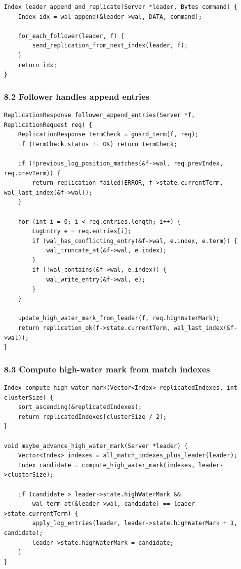 \documentclass[10pt,letterpaper]{article}
\begin{document}
\begin{verbatim}
Index leader_append_and_replicate(Server *leader, Bytes command) {
    Index idx = wal_append(&leader->wal, DATA, command);

    for_each_follower(leader, f) {
        send_replication_from_next_index(leader, f);
    }
    return idx;
}
\end{verbatim}

\subsubsection*{8.2 Follower handles append entries}

\begin{verbatim}
ReplicationResponse follower_append_entries(Server *f, ReplicationRequest req) {
    ReplicationResponse termCheck = guard_term(f, req);
    if (termCheck.status != OK) return termCheck;

    if (!previous_log_position_matches(&f->wal, req.prevIndex, req.prevTerm)) {
        return replication_failed(ERROR, f->state.currentTerm, wal_last_index(&f->wal));
    }

    for (int i = 0; i < req.entries.length; i++) {
        LogEntry e = req.entries[i];
        if (wal_has_conflicting_entry(&f->wal, e.index, e.term)) {
            wal_truncate_at(&f->wal, e.index);
        }
        if (!wal_contains(&f->wal, e.index)) {
            wal_write_entry(&f->wal, e);
        }
    }

    update_high_water_mark_from_leader(f, req.highWaterMark);
    return replication_ok(f->state.currentTerm, wal_last_index(&f->wal));
}
\end{verbatim}

\subsubsection*{8.3 Compute high-water mark from match indexes}

\begin{verbatim}
Index compute_high_water_mark(Vector<Index> replicatedIndexes, int clusterSize) {
    sort_ascending(&replicatedIndexes);
    return replicatedIndexes[clusterSize / 2];
}

void maybe_advance_high_water_mark(Server *leader) {
    Vector<Index> indexes = all_match_indexes_plus_leader(leader);
    Index candidate = compute_high_water_mark(indexes, leader->clusterSize);

    if (candidate > leader->state.highWaterMark &&
        wal_term_at(&leader->wal, candidate) == leader->state.currentTerm) {
        apply_log_entries(leader, leader->state.highWaterMark + 1, candidate);
        leader->state.highWaterMark = candidate;
    }
}
\end{verbatim}
\end{document}
